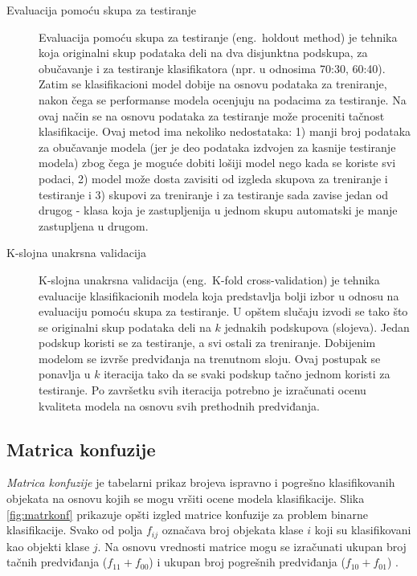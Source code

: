 \documentclass[12pt,oneside]{memoir}
\begin{document}
\begin{description}

\item[Evaluacija pomoću skupa za testiranje] Evaluacija pomoću skupa za testiranje (eng.~holdout method) je tehnika koja originalni skup podataka deli na dva disjunktna podskupa, za obučavanje i za testiranje klasifikatora (npr. u odnosima 70:30, 60:40). Zatim se klasifikacioni model dobije na osnovu podataka za treniranje, nakon čega se performanse modela ocenjuju na podacima za testiranje. Na ovaj način se na osnovu podataka za testiranje može proceniti tačnost klasifikacije. Ovaj metod ima nekoliko nedostataka: 1) manji broj podataka za obučavanje modela (jer je deo podataka izdvojen za kasnije testiranje modela) zbog čega je moguće dobiti lošiji model nego kada se koriste svi podaci, 2) model može dosta zavisiti od izgleda skupova za treniranje i testiranje i 3) skupovi za treniranje i za testiranje sada zavise jedan od drugog - klasa koja je zastupljenija u jednom skupu automatski je manje zastupljena u drugom.

\item[K-slojna unakrsna validacija] K-slojna unakrsna validacija (eng.~K-fold cross-validation) je tehnika evaluacije klasifikacionih modela koja predstavlja bolji izbor u odnosu na evaluaciju pomoću skupa za testiranje. U opštem slučaju izvodi se tako što se originalni skup podataka deli na $k$ jednakih podskupova (slojeva). Jedan podskup koristi se za testiranje, a svi ostali za treniranje. Dobijenim modelom se izvrše predviđanja na trenutnom sloju. Ovaj postupak se ponavlja u $k$ iteracija tako da se svaki podskup tačno jednom koristi za testiranje. Po završetku svih iteracija potrebno je izračunati ocenu kvaliteta modela na osnovu svih prethodnih predviđanja. 

\end{description}


\subsection{Matrica konfuzije}

\textit{Matrica konfuzije} je tabelarni prikaz brojeva ispravno i pogrešno klasifikovanih objekata na osnovu kojih se mogu vršiti ocene modela klasifikacije. Slika \ref{fig:matrkonf} prikazuje opšti izgled matrice konfuzije za problem binarne klasifikacije. Svako od polja $f_{ij}$ označava broj objekata klase $i$ koji su klasifikovani kao objekti klase $j$. Na osnovu vrednosti matrice mogu se izračunati ukupan broj tačnih predviđanja ($f_{11}+f_{00}$) i ukupan broj pogrešnih predviđanja ($f_{10}+f_{01}$) \cite{mitic}.
\end{document}
